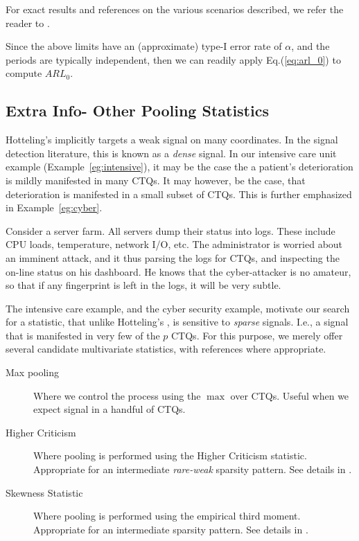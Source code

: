 \begin{extra}
For exact results and references on the various scenarios described, we refer the reader to \cite[Ch.7]{qiu_introduction_2013}.
\end{extra}

Since the above limits have an (approximate) type-I error rate of $\alpha$, and the periods are typically independent, then we can readily apply Eq.(\ref{eq:arl_0}) to compute $ARL_0$.



\subsection{Extra Info- Other Pooling Statistics}
Hotteling's \tsq implicitly targets a weak signal on many coordinates. 
In the signal detection literature, this is known as a \emph{dense} signal.
In our intensive care unit example (Example~\ref{eg:intensive}), it may be the case the a patient's deterioration is mildly manifested in many CTQs. It may however, be the case, that deterioration is manifested in a small subset of CTQs.
This is further emphasized in Example~\ref{eg:cyber}.

\begin{example}
\label{eg:cyber}
Consider a server farm. All servers dump their status into logs. These include CPU loads, temperature, network I/O, etc.
The administrator is worried about an imminent attack, and it thus parsing the logs for CTQs, and inspecting the on-line status on his dashboard.
He knows that the cyber-attacker is no amateur, so that if any fingerprint is left in the logs, it will be very subtle. 
\end{example}

The intensive care example, and the cyber security example, motivate our search for a statistic, that unlike Hotteling's \tsq, is sensitive to \emph{sparse} signals. 
I.e., a signal that is manifested in very few of the $p$ CTQs.
For this purpose, we merely offer several candidate multivariate statistics, with references where appropriate.
\begin{description}
\item [Max pooling] Where we control the process using the $\max$ over CTQs. Useful when we expect signal in a handful of CTQs.
\item [Higher Criticism] Where pooling is performed using the Higher Criticism statistic. Appropriate for an intermediate \emph{rare-weak} sparsity pattern. See details in \citep{jin_cosmological_2005}.
\item [Skewness Statistic] Where pooling is performed using the empirical third moment. Appropriate for an intermediate sparsity pattern. See details in \citep{jin_cosmological_2005}.
\end{description}







